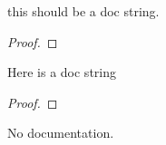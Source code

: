 
\begin{lemma}\label{List.aux}
        \leanok
                this should be a doc string.
    \end{lemma}

\begin{proof}
    \leanok
\end{proof}

\begin{theorem}\label{List.Nat.Ex}
        \leanok
                Here is a doc string
    \end{theorem}

\begin{proof}
    \leanok
\end{proof}

\begin{lemma}\label{List.test}
                No documentation.
    \end{lemma}

